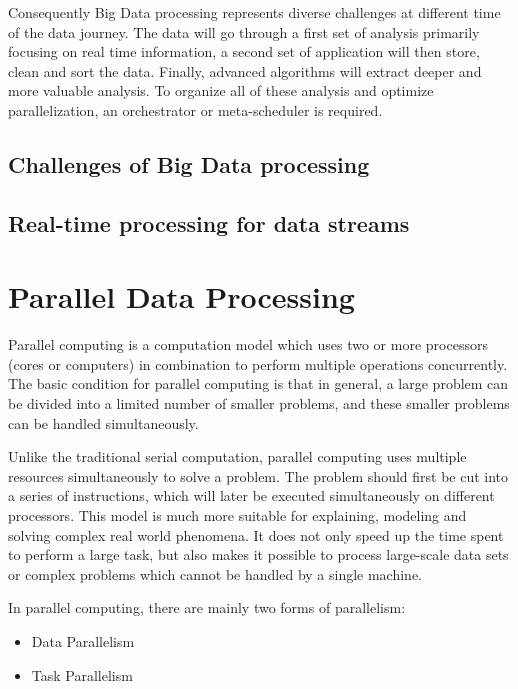 \documentclass[	DIV=calc,%
							paper=a4,%
							fontsize=11pt,%
							twocolumn]{scrartcl}	 					%
\newcommand{\initial}[1]{%
     \lettrine[lines=3,lhang=0.3,nindent=0em]{
     				\color{DarkBlue}
     				{\textsf{#1}}}{}}
\begin{document}
Consequently Big Data processing represents diverse challenges at different time of the data journey. The data will go through a first set of analysis primarily focusing on real time information, a second set of application will then store, clean and sort the data. Finally, advanced algorithms will extract deeper and more valuable analysis. To organize all of these analysis and optimize parallelization, an orchestrator or meta-scheduler is required.


\subsection*{Challenges of Big Data processing}\label{sec: challenges}

\subsection*{Real-time processing for data streams}
 

\section*{\color{DarkOrange}Parallel Data Processing}

\initial{P}arallel computing is a computation model which uses two or more processors (cores or computers) in combination to perform multiple operations concurrently. The basic condition for parallel computing is that in general, a large problem can be divided into a limited number of smaller problems, and these smaller problems can be handled simultaneously.
					
Unlike the traditional serial computation, parallel computing uses multiple resources simultaneously to solve a problem. The problem should first be cut into a series of instructions, which will later be executed simultaneously on different processors. This model is much more suitable for explaining, modeling and solving complex real world phenomena. It does not only speed up the time spent to perform a large task, but also makes it possible to process large-scale data sets or complex problems which cannot be handled by a single machine.
					
In parallel computing, there are mainly two forms of parallelism: 
\begin{itemize}
\item Data Parallelism

\item Task Parallelism

\end{itemize}
					
\end{document}
